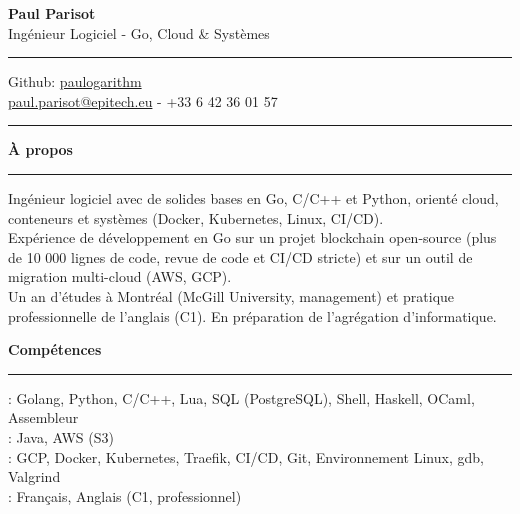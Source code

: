 \documentclass[9pt]{extarticle}
\begin{document}
\begin{center}
	{\huge\bfseries Paul Parisot}
	\\[9pt]
	{\Large Ingénieur Logiciel - Go, Cloud \& Systèmes}
	\\
\end{center}

\par\vspace{-5pt}
\rule{\linewidth}{0.4pt}
\par\vspace{-5pt}

\begin{center}
	Github: \href{https://github.com/paulogarithm}{paulogarithm}
	\\
	\href{mailto:paul.parisot@epitech.eu}{paul.parisot@epitech.eu} - +33 6 42 36 01 57
	\\
\end{center}

\par\vspace{-10pt}
\rule{\linewidth}{0.4pt}
\par\vspace{7pt}

{\large\bfseries À propos}
\par\vspace{-8pt}
\rule{\linewidth}{0.4pt}
\par\vspace{5pt}

Ingénieur logiciel avec de solides bases en Go, C/C++ et Python, orienté cloud, conteneurs et systèmes (Docker, Kubernetes, Linux, CI/CD).
\\
Expérience de développement en Go sur un projet blockchain open-source (plus de 10 000 lignes de code, revue de code et CI/CD stricte) et sur un outil de migration multi-cloud (AWS, GCP).
\\
Un an d'études à Montréal (McGill University, management) et pratique professionnelle de l'anglais (C1). En préparation de l'agrégation d'informatique.
\par\vspace{5pt}

{\large\bfseries Compétences}
\par\vspace{-8pt}
\rule{\linewidth}{0.4pt}
\par\vspace{5pt}

\hspace*{5pt}{\bfseries Maîtrise}: Golang, Python, C/C++, Lua, SQL (PostgreSQL), Shell, Haskell, OCaml, Assembleur
\\
\hspace*{5pt}{\bfseries Notions}: Java, AWS (S3)
\\
\hspace*{5pt}{\bfseries Cloud \& Outils}: GCP, Docker, Kubernetes, Traefik, CI/CD, Git, Environnement Linux, gdb, Valgrind
\\
\hspace*{5pt}{\bfseries Langues}: Français, Anglais (C1, professionnel)
\end{document}
